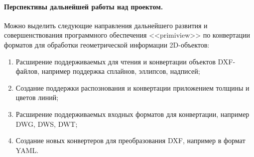 \paragraph{Перспективы дальнейшей работы над проектом.} Можно выделить следующие направления дальнейшего развития и совершенствования программного обеспечения <<primiview>> по конвертации форматов для обработки геометрической информации 2D-объектов:

\begin{enumerate}[1.]
	\item Расширение поддерживаемых для чтения и конвертации объектов DXF-файлов, например поддержка сплайнов, эллипсов, надписей;
	\item Создание поддержки распознования и конвертации приложением толщины и цветов линий;
	\item Расширение поддерживаемых входных форматов для конвертации, например DWG, DWS, DWT;
	\item Создание новых конвертеров для преобразования DXF, например в формат YAML.
\end{enumerate}


